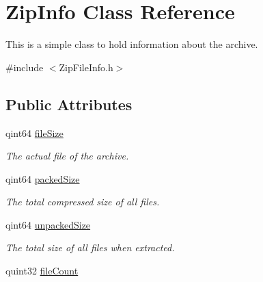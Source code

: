 \hypertarget{class_zip_info}{}\section{Zip\+Info Class Reference}
\label{class_zip_info}


This is a simple class to hold information about the archive.  




{\ttfamily \#include $<$Zip\+File\+Info.\+h$>$}

\subsection*{Public Attributes}
\begin{DoxyCompactItemize}
\item 
qint64 \hyperlink{class_zip_info_a55ffc6c88abc914588ab3c53a670e308}{file\+Size}\hypertarget{class_zip_info_a55ffc6c88abc914588ab3c53a670e308}{}\label{class_zip_info_a55ffc6c88abc914588ab3c53a670e308}

\begin{DoxyCompactList}\small\item\em The actual file of the archive. \end{DoxyCompactList}\item 
qint64 \hyperlink{class_zip_info_adfc0a1fb67cc5d94b3fa7cdf6508a999}{packed\+Size}\hypertarget{class_zip_info_adfc0a1fb67cc5d94b3fa7cdf6508a999}{}\label{class_zip_info_adfc0a1fb67cc5d94b3fa7cdf6508a999}

\begin{DoxyCompactList}\small\item\em The total compressed size of all files. \end{DoxyCompactList}\item 
qint64 \hyperlink{class_zip_info_a580c3b85b9d06646186357cd1612b6c0}{unpacked\+Size}\hypertarget{class_zip_info_a580c3b85b9d06646186357cd1612b6c0}{}\label{class_zip_info_a580c3b85b9d06646186357cd1612b6c0}

\begin{DoxyCompactList}\small\item\em The total size of all files when extracted. \end{DoxyCompactList}\item 
quint32 \hyperlink{class_zip_info_a104d1d7bf529b2ff87bba4d2b1fafd85}{file\+Count}\hypertarget{class_zip_info_a104d1d7bf529b2ff87bba4d2b1fafd85}{}\label{class_zip_info_a104d1d7bf529b2ff87bba4d2b1fafd85}


\end{DoxyCompactItemize}
